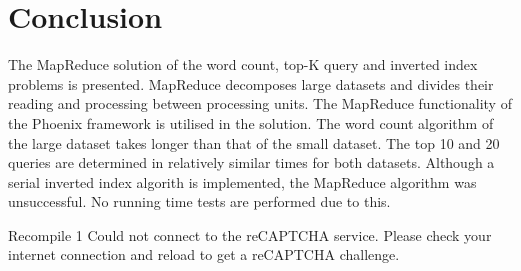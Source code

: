 \section{Conclusion}
The MapReduce solution of the word count, top-K query and inverted index problems is 
presented. MapReduce decomposes large datasets and divides their reading and processing 
between processing units. The MapReduce functionality of the Phoenix framework is utilised 
in the solution. The word count algorithm of the large dataset takes longer than that of the 
small dataset. The top 10 and 20 queries are determined in relatively similar times for both 
datasets. Although a serial inverted index algorith is implemented, the MapReduce algorithm 
was unsuccessful. No running time tests are performed due to this. 
 


  Recompile
1
Could not connect to the reCAPTCHA service. Please check your internet connection and reload to get a reCAPTCHA challenge.